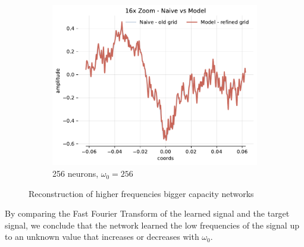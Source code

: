 \begin{figure}[h]
\begin{subfigure}[b]{0.32\textwidth}
        \centering
        \includegraphics[width=\textwidth]{img/ch4/16x-zoom-1hl-256hf-256hz.pdf}
        \caption{256 neurons, $\omega_0=256$}
        \label{fig:16x-zoom-1hl-256hf-256hz}
    \end{subfigure}
    \caption{Reconstruction of higher frequencies bigger capacity networks}
    \label{f:comparison-64-to-256-hf}
\end{figure}


By comparing the Fast Fourier Transform of the learned signal and the target signal, we conclude that the network learned the low frequencies of the signal up to an unknown value that increases or decreases with $\omega_0$.





